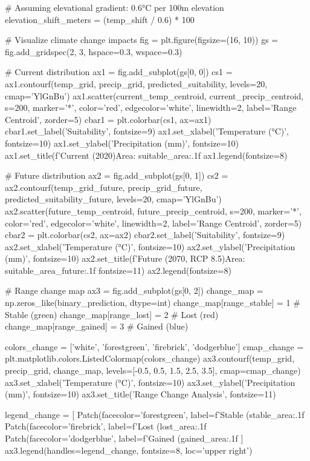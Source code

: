 \documentclass[11pt,a4paper]{article}
\begin{document}
\begin{pycode}
# Assuming elevational gradient: 0.6°C per 100m elevation
elevation_shift_meters = (temp_shift / 0.6) * 100

# Visualize climate change impacts
fig = plt.figure(figsize=(16, 10))
gs = fig.add_gridspec(2, 3, hspace=0.3, wspace=0.3)

# Current distribution
ax1 = fig.add_subplot(gs[0, 0])
cs1 = ax1.contourf(temp_grid, precip_grid, predicted_suitability,
                  levels=20, cmap='YlGnBu')
ax1.scatter(current_temp_centroid, current_precip_centroid, s=200,
           marker='*', color='red', edgecolor='white', linewidth=2,
           label='Range Centroid', zorder=5)
cbar1 = plt.colorbar(cs1, ax=ax1)
cbar1.set_label('Suitability', fontsize=9)
ax1.set_xlabel('Temperature (°C)', fontsize=10)
ax1.set_ylabel('Precipitation (mm)', fontsize=10)
ax1.set_title(f'Current (2020)\nSuitable Area: {suitable_area:.1f}%
ax1.legend(fontsize=8)

# Future distribution
ax2 = fig.add_subplot(gs[0, 1])
cs2 = ax2.contourf(temp_grid_future, precip_grid_future,
                  predicted_suitability_future, levels=20, cmap='YlGnBu')
ax2.scatter(future_temp_centroid, future_precip_centroid, s=200,
           marker='*', color='red', edgecolor='white', linewidth=2,
           label='Range Centroid', zorder=5)
cbar2 = plt.colorbar(cs2, ax=ax2)
cbar2.set_label('Suitability', fontsize=9)
ax2.set_xlabel('Temperature (°C)', fontsize=10)
ax2.set_ylabel('Precipitation (mm)', fontsize=10)
ax2.set_title(f'Future (2070, RCP 8.5)\nSuitable Area: {suitable_area_future:.1f}%
             fontsize=11)
ax2.legend(fontsize=8)

# Range change map
ax3 = fig.add_subplot(gs[0, 2])
change_map = np.zeros_like(binary_prediction, dtype=int)
change_map[range_stable] = 1  # Stable (green)
change_map[range_lost] = 2    # Lost (red)
change_map[range_gained] = 3  # Gained (blue)

colors_change = ['white', 'forestgreen', 'firebrick', 'dodgerblue']
cmap_change = plt.matplotlib.colors.ListedColormap(colors_change)
ax3.contourf(temp_grid, precip_grid, change_map,
            levels=[-0.5, 0.5, 1.5, 2.5, 3.5], cmap=cmap_change)
ax3.set_xlabel('Temperature (°C)', fontsize=10)
ax3.set_ylabel('Precipitation (mm)', fontsize=10)
ax3.set_title('Range Change Analysis', fontsize=11)

legend_change = [
    Patch(facecolor='forestgreen', label=f'Stable ({stable_area:.1f}%
    Patch(facecolor='firebrick', label=f'Lost ({lost_area:.1f}%
    Patch(facecolor='dodgerblue', label=f'Gained ({gained_area:.1f}%
]
ax3.legend(handles=legend_change, fontsize=8, loc='upper right')


\end{pycode}
\end{document}

